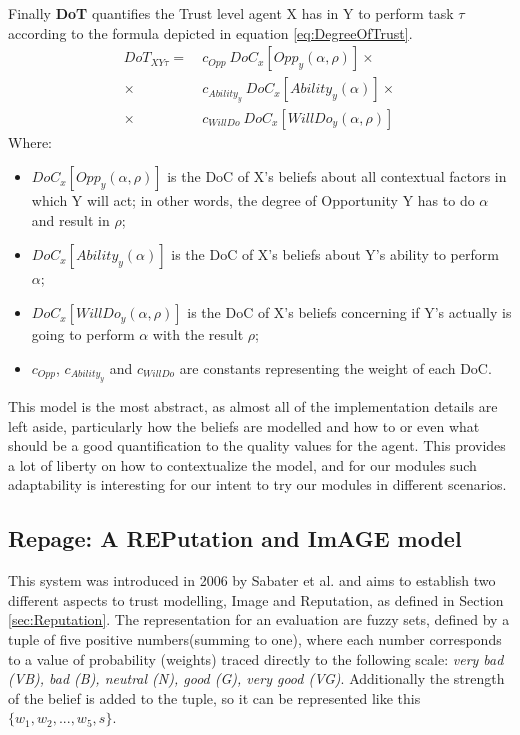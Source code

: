 Finally \textbf{\ac{DoT}} quantifies the Trust level agent X has in Y to perform task $\tau$ according to the formula depicted in equation \ref{eq:DegreeOfTrust}.
\begin{equation}
\begin{aligned}
DoT_{XY\tau} =\ &c_{Opp}\ DoC_x[Opp_y(\alpha, \rho)] \times\\
\times\ &c_{Ability_y}\ DoC_x[Ability_y(\alpha)]\times \\
\times\ &c_{WillDo}\ DoC_x[WillDo_y(\alpha, \rho)]
\end{aligned}
\label{eq:DegreeOfTrust}
\end{equation}
Where:
\begin{itemize}
    \item $DoC_x[Opp_y(\alpha, \rho)]$ is the \ac{DoC} of X's beliefs about all contextual factors in which Y will act; in other words, the degree of Opportunity Y has to do $\alpha$ and result in $\rho$;
    \item $DoC_x[Ability_y(\alpha)]$ is the \ac{DoC} of X's beliefs about Y's ability to perform $\alpha$;
    \item $DoC_x[WillDo_y(\alpha, \rho)]$ is the \ac{DoC} of X's beliefs concerning if Y's actually is going to perform $\alpha$ with the result $\rho$;
    \item $c_{Opp}$, $c_{Ability_y}$ and $c_{WillDo}$ are constants representing the weight of each \ac{DoC}.
\end{itemize}

This model is the most abstract, as almost all of the implementation details are left aside, particularly how the beliefs are modelled and how to or even what should be a good quantification to the quality values for the agent. This provides a lot of liberty on how to contextualize the model, and for our modules such adaptability is interesting for our intent to try our modules in different scenarios.

\subsection{Repage: A REPutation and ImAGE model}
\label{subsec:Related work:Trust Models:Repage}
This system was introduced in 2006 by Sabater et al.\cite{Sabater2006} and aims to establish two different aspects to trust modelling, Image and Reputation, as defined in Section \ref{sec:Reputation}. The representation for an evaluation are fuzzy sets, defined by a tuple of five positive numbers(summing to one), where each number corresponds to a value of probability (weights) traced directly to the following scale: \textit{very bad (VB), bad (B), neutral (N), good (G), very good (VG)}. Additionally the strength of the belief is added to the tuple, so it can be represented like this $\{w_1, w_2, ..., w_5, s\}$.


